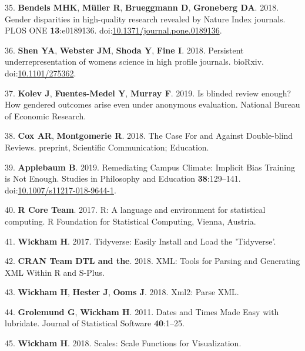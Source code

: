 \documentclass[11pt,]{article}
\begin{document}
\hypertarget{ref-bendels_gender_2018}{}
35. \textbf{Bendels MHK}, \textbf{Müller R}, \textbf{Brueggmann D},
\textbf{Groneberg DA}. 2018. Gender disparities in high-quality research
revealed by Nature Index journals. PLOS ONE \textbf{13}:e0189136.
doi:\href{https://doi.org/10.1371/journal.pone.0189136}{10.1371/journal.pone.0189136}.

\hypertarget{ref-Shen275362}{}
36. \textbf{Shen YA}, \textbf{Webster JM}, \textbf{Shoda Y},
\textbf{Fine I}. 2018. Persistent underrepresentation of womens science
in high profile journals. bioRxiv.
doi:\href{https://doi.org/10.1101/275362}{10.1101/275362}.

\hypertarget{ref-Kolev2019}{}
37. \textbf{Kolev J}, \textbf{Fuentes-Medel Y}, \textbf{Murray F}. 2019.
Is blinded review enough? How gendered outcomes arise even under
anonymous evaluation. National Bureau of Economic Research.

\hypertarget{ref-cox_case_2018}{}
38. \textbf{Cox AR}, \textbf{Montgomerie R}. 2018. The Case For and
Against Double-blind Reviews. preprint, Scientific Communication;
Education.

\hypertarget{ref-applebaum_remediating_2019}{}
39. \textbf{Applebaum B}. 2019. Remediating Campus Climate: Implicit
Bias Training is Not Enough. Studies in Philosophy and Education
\textbf{38}:129--141.
doi:\href{https://doi.org/10.1007/s11217-018-9644-1}{10.1007/s11217-018-9644-1}.

\hypertarget{ref-R_software_2017}{}
40. \textbf{R Core Team}. 2017. R: A language and environment for
statistical computing. R Foundation for Statistical Computing, Vienna,
Austria.

\hypertarget{ref-wickham_tidyverse_2017}{}
41. \textbf{Wickham H}. 2017. Tidyverse: Easily Install and Load the
'Tidyverse'.

\hypertarget{ref-duncan_xml_2018}{}
42. \textbf{CRAN Team DTL and the}. 2018. XML: Tools for Parsing and
Generating XML Within R and S-Plus.

\hypertarget{ref-wickham_xml2_2018}{}
43. \textbf{Wickham H}, \textbf{Hester J}, \textbf{Ooms J}. 2018. Xml2:
Parse XML.

\hypertarget{ref-grolemund_dates_2011}{}
44. \textbf{Grolemund G}, \textbf{Wickham H}. 2011. Dates and Times Made
Easy with lubridate. Journal of Statistical Software \textbf{40}:1--25.

\hypertarget{ref-wickham_scales_2018}{}
45. \textbf{Wickham H}. 2018. Scales: Scale Functions for Visualization.
\end{document}
